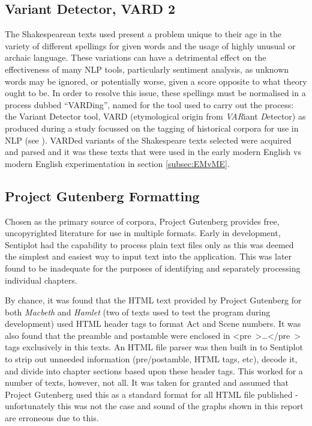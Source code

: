 \documentclass{article}
\begin{document}
    \subsection{Variant Detector, VARD 2}
    \label{subsec:vard}
        The Shakespearean texts used present a problem unique to their age in the variety of different spellings for given words and the usage of highly unusual or archaic language. These variations can have a detrimental effect on the effectiveness of many NLP tools, particularly sentiment analysis, as unknown words may be ignored, or potentially worse, given a score opposite to what theory ought to be. In order to resolve this issue, these spellings must be normalised in a process dubbed ``VARDing'', named for the tool used to carry out the process: the Variant Detector tool, VARD (etymological origin from \textit{VAR}iant \textit{D}etector) as produced during a study focussed on the tagging of historical corpora for use in NLP (see \cite{vard}). VARDed variants of the Shakespeare texts selected were acquired and parsed and it was these texts that were used in the early modern English vs modern English experimentation in section \ref{subsec:EMvME}.
    \subsection{Project Gutenberg Formatting}
    \label{subsec:gutenbergFormat}
            Chosen as the primary source of corpora, Project Gutenberg provides free, uncopyrighted literature for use in multiple formats. Early in development, Sentiplot had the capability to process plain text files only as this was deemed the simplest and easiest way to input text into the application. This was later found to be inadequate for the purposes of identifying and separately processing individual chapters.

            By chance, it was found that the HTML text provided by Project Gutenberg for both \textit{Macbeth} and \textit{Hamlet} (two of texts used to test the program during development) used HTML header tags to format Act and Scene numbers. It was also found that the preamble and postamble were enclosed in \mbox{\textless pre \textgreater \dots \textless /pre \textgreater} tags exclusively in this texts. An HTML file parser was then built in to Sentiplot to strip out unneeded information (pre/postamble, HTML tags, etc), decode it, and divide into chapter sections based upon these header tags. This worked for a number of texts, however, not all. It was taken for granted and assumed that Project Gutenberg used this as a standard format for all HTML file published - unfortunately this was not the case and sound of the graphs shown in this report are erroneous due to this.
            
\end{document}
